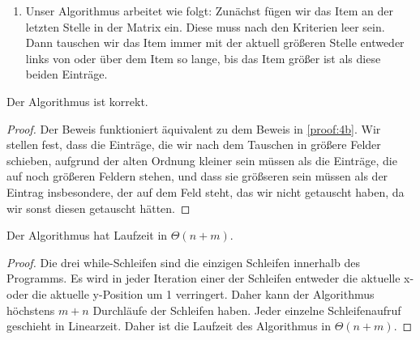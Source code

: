 \documentclass{scrartcl} %
\begin{document}
\begin{aufgabe}
\begin{enumerate}[label=(\alph*)]
\begin{proof}
                Da es also Schleifenaufrufe in $\BigO(n + m)$ gibt und diese in Linearzeit passieren, liegt die Laufzeit des Algorithmus in $\BigO(n + m)$.
            \end{proof}
            \item Unser Algorithmus arbeitet wie folgt: Zunächst fügen wir das Item an der letzten Stelle in der Matrix ein. Diese muss nach den Kriterien leer sein. Dann tauschen wir das Item immer mit der aktuell größeren Stelle entweder links von oder über dem Item so lange, bis das Item größer ist als diese beiden Einträge. 
            
        \end{enumerate}
        \begin{theorem*}
            Der Algorithmus ist korrekt.
        \end{theorem*}
        \begin{proof}
            Der Beweis funktioniert äquivalent zu dem Beweis in \ref{proof:4b}. Wir stellen fest, dass die Einträge, die wir nach dem Tauschen in größere Felder schieben, aufgrund der alten Ordnung kleiner sein müssen als die Einträge, die auf noch größeren Feldern stehen, und dass sie größseren sein müssen als der Eintrag insbesondere, der auf dem Feld steht, das wir nicht getauscht haben, da wir sonst diesen getauscht hätten.
        \end{proof}
        \begin{theorem*}
            Der Algorithmus hat Laufzeit in $\Theta(n + m)$.
        \end{theorem*}
        \begin{proof}
            Die drei {\ttfamily while}-Schleifen sind die einzigen Schleifen innerhalb des Programms. Es wird in jeder Iteration einer der Schleifen entweder die aktuelle {\ttfamily x}- oder die aktuelle {\ttfamily y}-Position um 1 verringert. Daher kann der Algorithmus höchstens $m + n$ Durchläufe der Schleifen haben. Jeder einzelne Schleifenaufruf geschieht in Linearzeit. Daher ist die Laufzeit des Algorithmus in $\Theta(n + m)$.
        \end{proof}
    \end{aufgabe}
\end{document}
